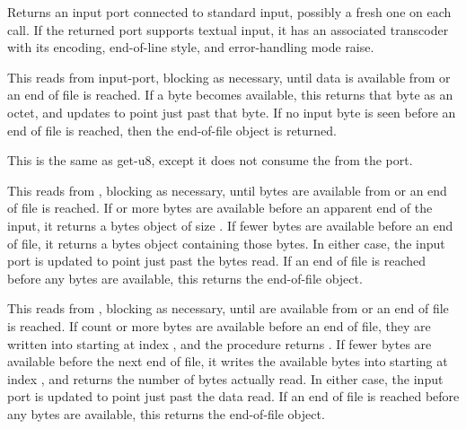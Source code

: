 \begin{entry}{%
}
   
Returns an input port connected to standard input, possibly a fresh
one on each call.  If the returned port supports textual input, it has
an associated transcoder with its encoding, end-of-line style, and
error-handling mode {\cf raise}.
\end{entry}

\begin{entry}{%
}
   
This reads from input-port, blocking as necessary, until data is
available from  or an end of file is reached. If a
byte becomes available, this returns that byte as an octet, and
updates  to point just past that byte. If no input
byte is seen before an end of file is reached, then the end-of-file
object is returned.
\end{entry}

\begin{entry}{%
}
   
This is the same as {\cf get-u8}, except it does not consume the
 from the port.
\end{entry}

\begin{entry}{%
}
   
This reads from , blocking as necessary, until 
bytes are available from  or an end of file is
reached. If  or more bytes are available before an apparent end
of the input, it returns a bytes object of size . If fewer
bytes are available before an end of file, it returns a bytes object
containing those bytes. In either case, the input port is updated to
point just past the bytes read.  If an end of file is reached before
any bytes are available, this returns the end-of-file object.
\end{entry}

\begin{entry}{%
}
   
   
This reads from , blocking as necessary, until
 are available from  or an end of file is
reached. If count or more bytes are available before an end of file,
they are written into  starting at index , and
the procedure returns . If fewer bytes are available before
the next end of file, it writes the available bytes into 
starting at index , and returns the number of bytes actually
read. In either case, the input port is updated to point just past the
data read. If an end of file is reached before any bytes
are available, this returns the end-of-file object.
\end{entry}

